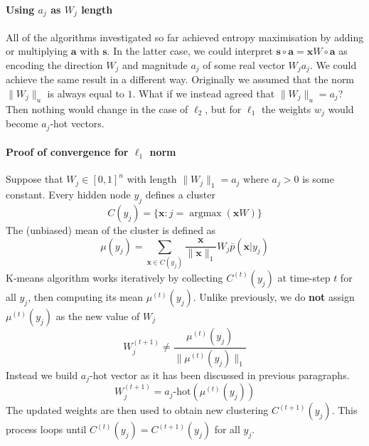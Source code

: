 \documentclass[12pt]{article}
\DeclareMathOperator*{\argmax}{argmax}
\begin{document}
\paragraph{Using $a_j$ as $W_j$ length}
All of the algorithms investigated so far achieved entropy maximisation by adding or multiplying $\boldsymbol{a}$ with $\boldsymbol{s}$. In the latter case, we could interpret $\boldsymbol{s}\circ \boldsymbol{a}=\boldsymbol{x}W\circ \boldsymbol{a}$ as encoding the direction  $W_j$ and  magnitude $a_j$ of some real vector $W_j a_j$.
We could achieve the same result in a different way. Originally we assumed that the norm $\lVert W_j \rVert_u$ is always equal to $1$. What if we instead agreed that $\lVert W_j \rVert_u=a_j$? Then nothing would change in the case of $\ell_2$, but for $\ell_1$ the weights $w_j$ would become $a_j$-hot vectors. 

\paragraph{Proof of convergence for $\ell_1$ norm} \label{par:l1_proof} Suppose that $W_j \in [0,1]^n$ with length $\lVert W_j \rVert_1 = a_j$ where $a_j>0$ is some constant.
Every hidden node $y_j$ defines a cluster
\[
C(y_j) = \{\boldsymbol{x} : j=\argmax(\boldsymbol{x}W)\}
\]
The (unbiased) mean of the cluster is defined as
\[
\mu(y_j) = \sum_{\boldsymbol{x}\in C(y_j)} \frac{\boldsymbol{x}}{\lVert \boldsymbol{x} \rVert_1} W_j \bar{p}(\boldsymbol{x}|y_j)
\]
K-means algorithm works iteratively by collecting $C^{(t)}(y_j)$ at time-step $t$ for all $y_j$, then computing its mean $\mu^{(t)}(y_j)$. Unlike previously, we do \textbf{not} assign $\mu^{(t)}(y_j)$ as the new value of $W_j$
\[
W_j^{(t+1)} \ne \frac{\mu^{(t)}(y_j)}{\lVert \mu^{(t)}(y_j) \rVert_1}
\]
Instead we build $a_j$-hot vector as it has been discussed in previous paragraphs.
\[
W_j^{(t+1)} = a_j\text{-hot}(\mu^{(t)}(y_j))
\]
The updated weights are then used to obtain new clustering $C^{(t+1)}(y_j)$. This process loops until $C^{(t)}(y_j)=C^{(t+1)}(y_j)$ for all $y_j$. 
\end{document}
